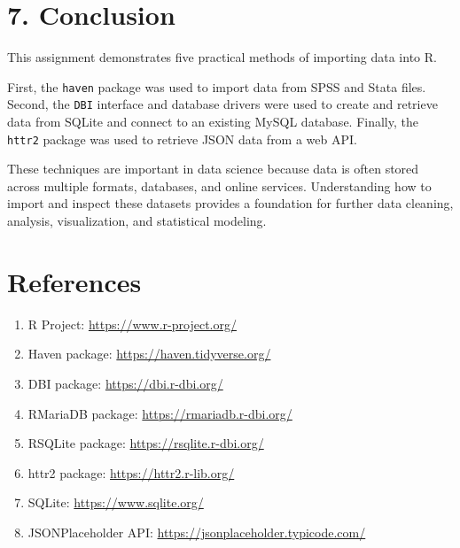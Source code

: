 \documentclass[
]{article}
\providecommand{\tightlist}{%
  \setlength{\itemsep}{0pt}\setlength{\parskip}{0pt}}
\begin{document}
\section{7. Conclusion}\label{conclusion}

This assignment demonstrates five practical methods of importing data
into R.

First, the \texttt{haven} package was used to import data from SPSS and
Stata files. Second, the \texttt{DBI} interface and database drivers
were used to create and retrieve data from SQLite and connect to an
existing MySQL database. Finally, the \texttt{httr2} package was used to
retrieve JSON data from a web API.

These techniques are important in data science because data is often
stored across multiple formats, databases, and online services.
Understanding how to import and inspect these datasets provides a
foundation for further data cleaning, analysis, visualization, and
statistical modeling.

\section{References}\label{references}

\begin{enumerate}
\def\labelenumi{\arabic{enumi}.}
\tightlist
\item
  R Project: \url{https://www.r-project.org/}
\item
  Haven package: \url{https://haven.tidyverse.org/}
\item
  DBI package: \url{https://dbi.r-dbi.org/}
\item
  RMariaDB package: \url{https://rmariadb.r-dbi.org/}
\item
  RSQLite package: \url{https://rsqlite.r-dbi.org/}
\item
  httr2 package: \url{https://httr2.r-lib.org/}
\item
  SQLite: \url{https://www.sqlite.org/}
\item
  JSONPlaceholder API: \url{https://jsonplaceholder.typicode.com/}
\end{enumerate}
\end{document}
